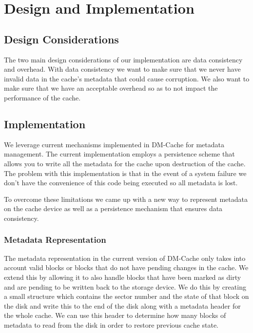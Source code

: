 \section{Design and Implementation}
\label{sec:implementation}

\subsection{Design Considerations}

The two main design considerations of our implementation are data
consistency and overhead. With data consistency we want to make sure
that we never have invalid data in the cache's metadata that could
cause corruption. We also want to make sure that we have an acceptable
overhead so as to not impact the performance of the cache.

\subsection{Implementation}

We leverage current mechanisms implemented in DM-Cache for metadata
management. The current implementation employs a persistence scheme
that allows you to write all the metadata for the cache upon
destruction of the cache. The problem with this implementation is that
in the event of a system failure we don't have the convenience of this
code being executed so all metadata is lost.

To overcome these limitations we came up with a new way to represent
metadata on the cache device as well as a persistence mechanism that
ensures data consistency.

\subsubsection{Metadata Representation}

The metadata representation in the current version of DM-Cache only
takes into account valid blocks or blocks that do not have pending
changes in the cache. We extend this by allowing it to also handle
blocks that have been marked as dirty and are pending to be written
back to the storage device. We do this by creating a small structure
which contains the sector number and the state of that block on the
disk and write this to the end of the disk along with a metadata
header for the whole cache. We can use this header to determine how
many blocks of metadata to read from the disk in order to restore
previous cache state.

